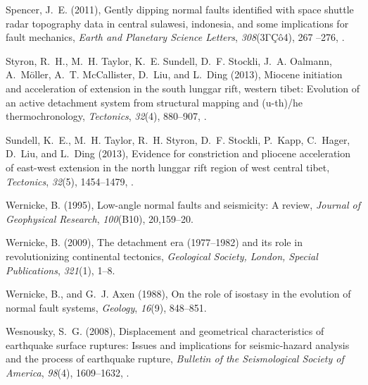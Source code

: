 \documentclass[twocolumn,grl]{AGUTeX}
\begin{document}
\begin{article}
\begin{thebibliography}{29}
Spencer, J.~E. (2011), Gently dipping normal faults identified with space
  shuttle radar topography data in central sulawesi, indonesia, and some
  implications for fault mechanics, \textit{Earth and Planetary Science
  Letters}, \textit{308}(3ΓÇô4), 267 --276, .

Styron, R.~H., M.~H. Taylor, K.~E. Sundell, D.~F. Stockli, J.~A. Oalmann,
  A.~M{\"o}ller, A.~T. McCallister, D.~Liu, and L.~Ding (2013), Miocene
  initiation and acceleration of extension in the south lunggar rift, western
  tibet: Evolution of an active detachment system from structural mapping and
  (u-th)/he thermochronology, \textit{Tectonics}, \textit{32}(4), 880--907,
  .

Sundell, K.~E., M.~H. Taylor, R.~H. Styron, D.~F. Stockli, P.~Kapp, C.~Hager,
  D.~Liu, and L.~Ding (2013), Evidence for constriction and pliocene
  acceleration of east-west extension in the north lunggar rift region of west
  central tibet, \textit{Tectonics}, \textit{32}(5), 1454--1479,
  .

Wernicke, B. (1995), Low-angle normal faults and seismicity: A review,
  \textit{Journal of Geophysical Research}, \textit{100}(B10), 20,159--20.

Wernicke, B. (2009), The detachment era (1977--1982) and its role in
  revolutionizing continental tectonics, \textit{Geological Society, London,
  Special Publications}, \textit{321}(1), 1--8.

Wernicke, B., and G.~J. Axen (1988), On the role of isostasy in the evolution
  of normal fault systems, \textit{Geology}, \textit{16}(9), 848--851.

Wesnousky, S.~G. (2008), Displacement and geometrical characteristics of
  earthquake surface ruptures: Issues and implications for seismic-hazard
  analysis and the process of earthquake rupture, \textit{Bulletin of the
  Seismological Society of America}, \textit{98}(4), 1609--1632,
  .

\end{thebibliography}



\end{article}


%
%
\end{document}
